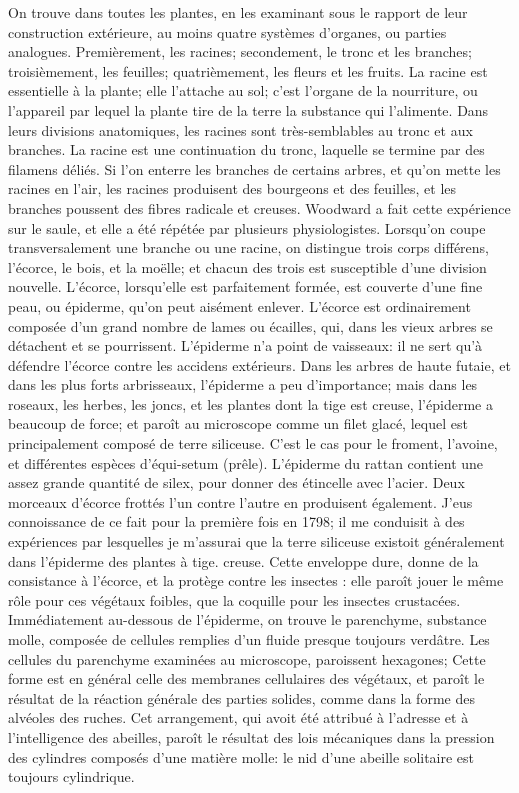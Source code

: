 On trouve dans toutes les plantes, en les examinant sous le rapport de leur construction extérieure, au moins quatre systèmes d'organes, ou parties analogues. Premièrement, les racines; secondement, le tronc et les branches; troisièmement, les feuilles; quatrièmement, les fleurs et les fruits.
La racine est essentielle à la plante; elle l'attache au sol; c'est l'organe de la nourriture, ou l'appareil par lequel la plante tire de la terre la substance qui l'alimente. Dans leurs divisions anatomiques, les racines sont très-semblables au tronc et aux branches. La racine est une continuation du tronc, laquelle se termine par des filamens déliés. Si l'on enterre les branches de certains arbres, et qu'on mette les racines en l'air, les racines produisent des bourgeons et des feuilles, et les branches poussent des fibres radicale et creuses. Woodward a fait cette expérience sur le saule, et elle a été répétée par plusieurs physiologistes.
Lorsqu'on coupe transversalement une branche ou une racine, on distingue trois\setcounter{page}{375} corps différens, l'écorce, le bois, et la moëlle; et chacun des trois est susceptible d'une division nouvelle.
L'écorce, lorsqu'elle est parfaitement formée, est couverte d'une fine peau, ou épiderme, qu'on peut aisément enlever. L'écorce est ordinairement composée d'un grand nombre de lames ou écailles, qui, dans les vieux arbres se détachent et se pourrissent. L'épiderme n'a point de vaisseaux: il ne sert qu'à défendre l'écorce contre les accidens extérieurs. Dans les arbres de haute futaie, et dans les plus forts arbrisseaux, l'épiderme a peu d'importance; mais dans les roseaux, les herbes, les joncs, et les plantes dont la tige est creuse, l'épiderme a beaucoup de force; et paroît au microscope comme un filet glacé, lequel est principalement composé de terre siliceuse. C'est le cas pour le froment, l'avoine, et différentes espèces d'équi-setum (prêle). L'épiderme du rattan contient une assez grande quantité de silex, pour donner des étincelle avec l'acier. Deux morceaux d'écorce frottés l'un contre l'autre en produisent également. J'eus connoissance de ce fait pour la première fois en 1798; il me conduisit à des expériences par lesquelles je m'assurai que la terre siliceuse existoit généralement dans l'épiderme des plantes à tige.\setcounter{page}{376} creuse. Cette enveloppe dure, donne de la consistance à l'écorce, et la protège contre les insectes : elle paroît jouer le même rôle pour ces végétaux foibles, que la coquille pour les insectes crustacées.
Immédiatement au-dessous de l'épiderme, on trouve le parenchyme, substance molle, composée de cellules remplies d'un fluide presque toujours verdâtre. Les cellules du parenchyme examinées au microscope, paroissent hexagones; Cette forme est en général celle des membranes cellulaires des végétaux, et paroît le résultat de la réaction générale des parties solides, comme dans la forme des alvéoles des ruches. Cet arrangement, qui avoit été attribué à l'adresse et à l'intelligence des abeilles, paroît le résultat des lois mécaniques dans la pression des cylindres composés d'une matière molle: le nid d'une abeille solitaire est toujours cylindrique.
